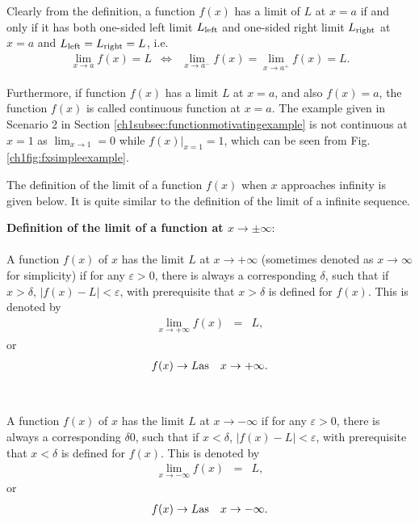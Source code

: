 Clearly from the definition, a function $f(x)$ has a limit of $L$ at $x=a$ if and only if it has both one-sided left limit $L_\textup{left}$ and one-sided right limit $L_\textup{right}$ at $x=a$ and $L_\textup{left}=L_\textup{right}=L$, i.e.
\begin{eqnarray}
  \lim_{x\rightarrow a}f(x)=L &\Leftrightarrow& \lim_{x\rightarrow a^-}f(x) = \lim_{x\rightarrow a^+}f(x) = L. \nonumber
\end{eqnarray}

Furthermore, if function $f(x)$ has a limit $L$ at $x=a$, and also $f(x)=a$, the function $f(x)$ is called continuous function at $x=a$. The example given in Scenario 2 in Section \ref{ch1subsec:functionmotivatingexample} is not continuous at $x=1$ as $\lim_{x\rightarrow 1}=0$ while $\left.f(x)\right|_{x=1}=1$, which can be seen from Fig. \ref{ch1fig:fxsimpleexample}.

The definition of the limit of a function $f(x)$ when $x$ approaches infinity is given below. It is quite similar to the definition of the limit of a infinite sequence.
\begin{VF}
\textbf{Definition of the limit of a function at $x\rightarrow \pm \infty$}:
\\
\\
\noindent A function $f(x)$ of $x$ has the limit $L$ at $x \rightarrow +\infty$ (sometimes denoted as $x \rightarrow \infty$ for simplicity) if for any $\varepsilon > 0$, there is always a corresponding $\delta$, such that if $x > \delta$, $|f(x)-L| < \varepsilon$, with prerequisite that $x > \delta$ is defined for $f(x)$. This is denoted by
\begin{eqnarray}
   \lim_{x\rightarrow +\infty} f(x) &=& L, \nonumber
\end{eqnarray}
or
\begin{eqnarray}
  f(x) \rightarrow L & \textup{as} & x \rightarrow +\infty. \nonumber
\end{eqnarray}
\\
\\
\noindent A function $f(x)$ of $x$ has the limit $L$ at $x \rightarrow -\infty$ if for any $\varepsilon > 0$, there is always a corresponding $\delta0$, such that if $x < \delta$, $|f(x)-L| < \varepsilon$, with prerequisite that $x < \delta$ is defined for $f(x)$. This is denoted by
\begin{eqnarray}
   \lim_{x\rightarrow -\infty} f(x) &=& L, \nonumber
\end{eqnarray}
or
\begin{eqnarray}
  f(x) \rightarrow L & \textup{as} & x \rightarrow -\infty. \nonumber
\end{eqnarray}
\end{VF}

